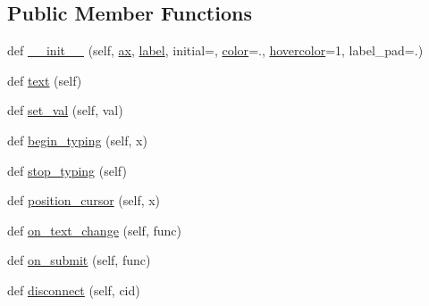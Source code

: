 \subsection*{Public Member Functions}
\begin{DoxyCompactItemize}
\item 
def \hyperlink{classmatplotlib_1_1widgets_1_1TextBox_afc3ee9630ca2be79b517ba96f5ded944}{\+\_\+\+\_\+init\+\_\+\+\_\+} (self, \hyperlink{classmatplotlib_1_1widgets_1_1AxesWidget_ac0722858b7001d10a42055dc90420b4f}{ax}, \hyperlink{classmatplotlib_1_1widgets_1_1TextBox_aa53ee24464cfcdcd484a6f83bf7ed41f}{label}, initial=\textquotesingle{}\textquotesingle{}, \hyperlink{classmatplotlib_1_1widgets_1_1TextBox_acfeec0fa796162b15e0b91597a3c019a}{color}=\textquotesingle{}.\textquotesingle{}, \hyperlink{classmatplotlib_1_1widgets_1_1TextBox_ab58efe36eb3c8bf787a87f6c133bdceb}{hovercolor}=\textquotesingle{}1\textquotesingle{}, label\+\_\+pad=.)
\item 
def \hyperlink{classmatplotlib_1_1widgets_1_1TextBox_a4333bf906554246a9add4887b7c526e8}{text} (self)
\item 
def \hyperlink{classmatplotlib_1_1widgets_1_1TextBox_abb692cbd23569c3e76a75aa49ddec073}{set\+\_\+val} (self, val)
\item 
def \hyperlink{classmatplotlib_1_1widgets_1_1TextBox_ab6797a0cb90afe38c8b3d4e79d1a70e8}{begin\+\_\+typing} (self, x)
\item 
def \hyperlink{classmatplotlib_1_1widgets_1_1TextBox_a12baa536affd3087d50837ab47078f84}{stop\+\_\+typing} (self)
\item 
def \hyperlink{classmatplotlib_1_1widgets_1_1TextBox_a52fbe17d4504d714763d2fb086134571}{position\+\_\+cursor} (self, x)
\item 
def \hyperlink{classmatplotlib_1_1widgets_1_1TextBox_a8d976d6a87d70d4bcf4ee7f76f65fc12}{on\+\_\+text\+\_\+change} (self, func)
\item 
def \hyperlink{classmatplotlib_1_1widgets_1_1TextBox_a99841a2730d45a63e6745626f9576338}{on\+\_\+submit} (self, func)
\item 
def \hyperlink{classmatplotlib_1_1widgets_1_1TextBox_ac53445dd12b77ff01b0da70be22a7cf0}{disconnect} (self, cid)
\end{DoxyCompactItemize}
